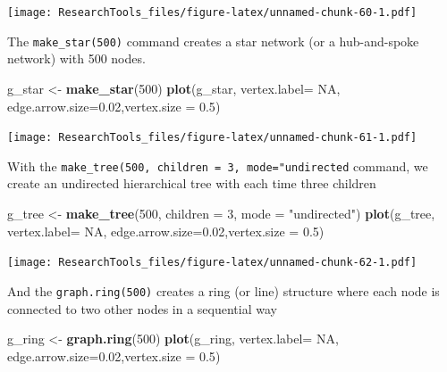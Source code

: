 \documentclass[]{article}
\newenvironment{Shaded}{\begin{snugshade}}{\end{snugshade}}
\newcommand{\KeywordTok}[1]{\textcolor[rgb]{0.13,0.29,0.53}{\textbf{#1}}}
\newcommand{\DataTypeTok}[1]{\textcolor[rgb]{0.13,0.29,0.53}{#1}}
\newcommand{\DecValTok}[1]{\textcolor[rgb]{0.00,0.00,0.81}{#1}}
\newcommand{\FloatTok}[1]{\textcolor[rgb]{0.00,0.00,0.81}{#1}}
\newcommand{\StringTok}[1]{\textcolor[rgb]{0.31,0.60,0.02}{#1}}
\newcommand{\OtherTok}[1]{\textcolor[rgb]{0.56,0.35,0.01}{#1}}
\newcommand{\NormalTok}[1]{#1}
\theoremstyle{definition}
\theoremstyle{definition}
\theoremstyle{definition}
\theoremstyle{remark}
\begin{document}
\texttt{[image: ResearchTools\_files/figure-latex/unnamed-chunk-60-1.pdf]}

The \texttt{make\_star(500)} command creates a star network (or a
hub-and-spoke network) with 500 nodes.

\begin{Shaded}
\begin{Highlighting}[]
\NormalTok{g_star <-}\StringTok{ }\KeywordTok{make_star}\NormalTok{(}\DecValTok{500}\NormalTok{)}
\KeywordTok{plot}\NormalTok{(g_star, }\DataTypeTok{vertex.label=} \OtherTok{NA}\NormalTok{, }\DataTypeTok{edge.arrow.size=}\FloatTok{0.02}\NormalTok{,}\DataTypeTok{vertex.size =} \FloatTok{0.5}\NormalTok{)}
\end{Highlighting}
\end{Shaded}

\texttt{[image: ResearchTools\_files/figure-latex/unnamed-chunk-61-1.pdf]}

With the \texttt{make\_tree(500,\ children\ =\ 3,\ mode="undirected}
command, we create an undirected hierarchical tree with each time three
children

\begin{Shaded}
\begin{Highlighting}[]
\NormalTok{g_tree <-}\StringTok{ }\KeywordTok{make_tree}\NormalTok{(}\DecValTok{500}\NormalTok{, }\DataTypeTok{children =} \DecValTok{3}\NormalTok{, }\DataTypeTok{mode =} \StringTok{"undirected"}\NormalTok{)}
\KeywordTok{plot}\NormalTok{(g_tree, }\DataTypeTok{vertex.label=} \OtherTok{NA}\NormalTok{, }\DataTypeTok{edge.arrow.size=}\FloatTok{0.02}\NormalTok{,}\DataTypeTok{vertex.size =} \FloatTok{0.5}\NormalTok{)}
\end{Highlighting}
\end{Shaded}

\texttt{[image: ResearchTools\_files/figure-latex/unnamed-chunk-62-1.pdf]}

And the \texttt{graph.ring(500)} creates a ring (or line) structure
where each node is connected to two other nodes in a sequential way

\begin{Shaded}
\begin{Highlighting}[]
\NormalTok{g_ring <-}\StringTok{ }\KeywordTok{graph.ring}\NormalTok{(}\DecValTok{500}\NormalTok{)}
\KeywordTok{plot}\NormalTok{(g_ring, }\DataTypeTok{vertex.label=} \OtherTok{NA}\NormalTok{, }\DataTypeTok{edge.arrow.size=}\FloatTok{0.02}\NormalTok{,}\DataTypeTok{vertex.size =} \FloatTok{0.5}\NormalTok{)}
\end{Highlighting}
\end{Shaded}
\end{document}
